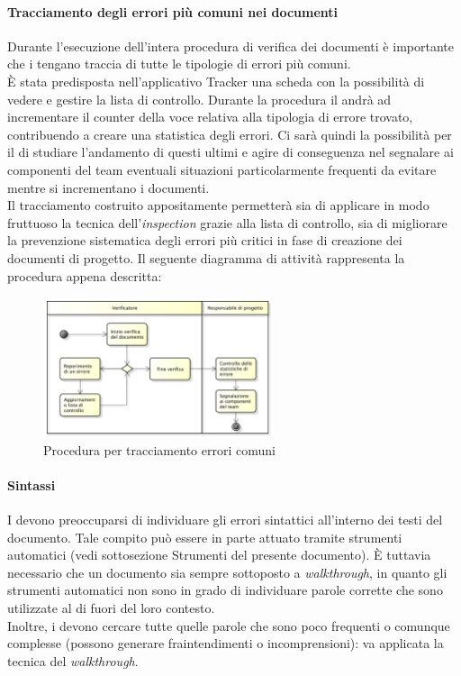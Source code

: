 			\paragraph{Tracciamento degli errori più comuni nei documenti}
				Durante l'esecuzione dell'intera procedura di verifica dei documenti è importante che i  tengano traccia di tutte le tipologie di errori più comuni. \\
			È stata predisposta nell'applicativo Tracker una scheda con la possibilità di vedere e gestire la lista di controllo. Durante la procedura il  andrà ad incrementare il counter della voce relativa alla tipologia di errore trovato, contribuendo a creare una statistica degli errori. Ci sarà quindi la possibilità per il  di studiare l'andamento di questi ultimi e agire di conseguenza nel segnalare ai componenti del team eventuali situazioni particolarmente frequenti da evitare mentre si incrementano i documenti.\\
			Il tracciamento costruito appositamente permetterà sia di applicare in modo fruttuoso la tecnica dell'\textit{inspection} grazie alla lista di controllo, sia di migliorare la prevenzione sistematica degli errori più critici in fase di creazione dei documenti di progetto.
			Il seguente diagramma di attività rappresenta la procedura appena descritta:
				\begin{figure}[H]
					\centering
					\includegraphics[width=0.6\textwidth]{NormeDiProgetto/Pics/ProceduraDecrementoErrori.pdf}
					\caption{Procedura per tracciamento errori comuni}
				\end{figure}
			\paragraph{Sintassi}
				I  devono preoccuparsi di individuare gli errori sintattici all'interno dei testi del documento. Tale compito può essere in parte attuato tramite strumenti automatici (vedi sottosezione Strumenti del presente documento). È tuttavia necessario che un documento sia sempre sottoposto a \textit{walkthrough}, in quanto gli strumenti automatici non sono in grado di individuare parole corrette che sono utilizzate al di fuori del loro contesto.\\
				Inoltre, i  devono cercare tutte quelle parole che sono poco frequenti o comunque complesse (possono generare fraintendimenti o incomprensioni): va applicata la tecnica del \textit{walkthrough}.

